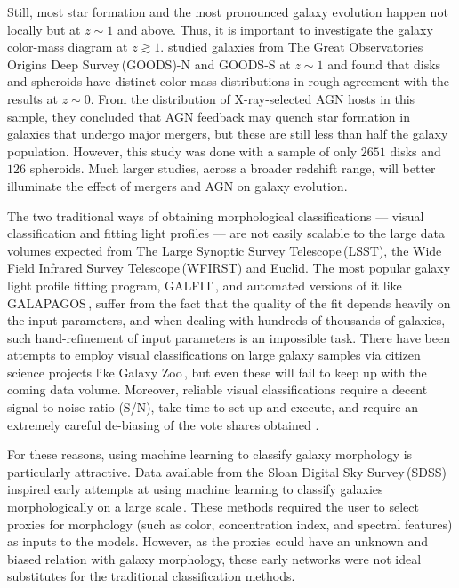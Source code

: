 Still, most star formation and the most pronounced galaxy evolution happen not locally but at $z\sim1$ and above. Thus, it is important to investigate the galaxy color-mass diagram at $z\gtrsim1$. \citet{powell_17} studied galaxies from The Great Observatories Origins Deep Survey\,(GOODS)-N and GOODS-S at $z\sim1$ and found that disks and spheroids have distinct color-mass distributions in rough agreement with the results at $z\sim0$. From the distribution of X-ray-selected AGN hosts in this sample, they concluded that AGN feedback may quench star formation in galaxies that undergo major mergers, but these are still less than half the galaxy population. However, this study was done with a sample of only $2651$ disks and $126$ spheroids. Much larger studies, across a broader redshift range, will better illuminate the effect of mergers and AGN on galaxy evolution. 

The two traditional ways of obtaining morphological classifications --- visual classification and fitting light profiles --- are not easily scalable to the large data volumes expected from The Large Synoptic Survey Telescope\,(LSST), the Wide Field Infrared Survey Telescope\,(WFIRST) and Euclid. The most popular galaxy light profile fitting program, GALFIT\,\citep{galfit}, and automated versions of it like GALAPAGOS\,\citep{galapagos}, suffer from the fact that the quality of the fit depends heavily on the input parameters, and when dealing with hundreds of thousands of galaxies, such hand-refinement of input parameters is an impossible task. There have been attempts to employ visual classifications on large galaxy samples via citizen science projects like Galaxy Zoo\,\citep{gzoo_p1,gzoo_p2}, but even these will fail to keep up with the coming data volume. Moreover, reliable visual classifications require a decent signal-to-noise ratio (S/N), take time to set up and execute, and require an extremely careful de-biasing of the vote shares obtained \citep{gzoo_p1,gzoo_candels}. 

For these reasons, using machine learning to classify galaxy morphology is particularly attractive. Data available from the Sloan Digital Sky Survey\,(SDSS) inspired early attempts at using machine learning to classify galaxies morphologically on a large scale\,\citep[e.g.,][]{Ball2004GalaxyNetworks,Kelly2004MorphologicalSurvey,banerji_10}. These methods required the user to select proxies for morphology (such as color, concentration index, and spectral features) as inputs to the models. However, as the proxies could have an unknown and biased relation with galaxy morphology, these early networks were not ideal substitutes for the traditional classification methods. 

